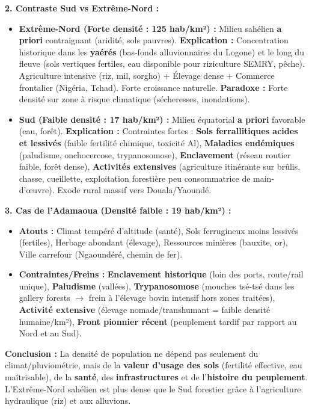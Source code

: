 \documentclass[11pt]{article}
\begin{document}
\begin{exoresolu}
\textbf{2. Contraste Sud vs Extrême-Nord :}
\begin{itemize}
    \item \textbf{Extrême-Nord (Forte densité : 125 hab/km²) :} Milieu sahélien \textbf{a priori} contraignant (aridité, sols pauvres). \textbf{Explication :} Concentration historique dans les \textbf{yaérés} (bas-fonds alluvionnaires du Logone) et le long du fleuve (sols vertiques fertiles, eau disponible pour riziculture SEMRY, pêche). Agriculture intensive (riz, mil, sorgho) + Élevage dense + Commerce frontalier (Nigéria, Tchad). Forte croissance naturelle. \textbf{Paradoxe :} Forte densité sur zone à risque climatique (sécheresses, inondations).
    \item \textbf{Sud (Faible densité : 17 hab/km²) :} Milieu équatorial \textbf{a priori} favorable (eau, forêt). \textbf{Explication :} Contraintes fortes : \textbf{Sols ferrallitiques acides et lessivés} (faible fertilité chimique, toxicité Al), \textbf{Maladies endémiques} (paludisme, onchocercose, trypanosomose), \textbf{Enclavement} (réseau routier faible, forêt dense), \textbf{Activités extensives} (agriculture itinérante sur brûlis, chasse, cueillette, exploitation forestière peu consommatrice de main-d'œuvre). Exode rural massif vers Douala/Yaoundé.
\end{itemize}

\textbf{3. Cas de l'Adamaoua (Densité faible : 19 hab/km²) :}
\begin{itemize}
    \item \textbf{Atouts :} Climat tempéré d'altitude (santé), Sols ferrugineux moins lessivés (fertiles), Herbage abondant (élevage), Ressources minières (bauxite, or), Ville carrefour (Ngaoundéré, chemin de fer).
    \item \textbf{Contraintes/Freins :} \textbf{Enclavement historique} (loin des ports, route/rail unique), \textbf{Paludisme} (vallées), \textbf{Trypanosomose} (mouches tsé-tsé dans les gallery forests $\rightarrow$ frein à l'élevage bovin intensif hors zones traitées), \textbf{Activité extensive} (élevage nomade/transhumant = faible densité humaine/km²), \textbf{Front pionnier récent} (peuplement tardif par rapport au Nord et au Sud).
\end{itemize}

\textbf{Conclusion :} La densité de population ne dépend pas seulement du climat/pluviométrie, mais de la \textbf{valeur d'usage des sols} (fertilité effective, eau maîtrisable), de la \textbf{santé}, des \textbf{infrastructures} et de l'\textbf{histoire du peuplement}. L'Extrême-Nord sahélien est plus dense que le Sud forestier grâce à l'agriculture hydraulique (riz) et aux alluvions.
\end{exoresolu}
\end{document}
